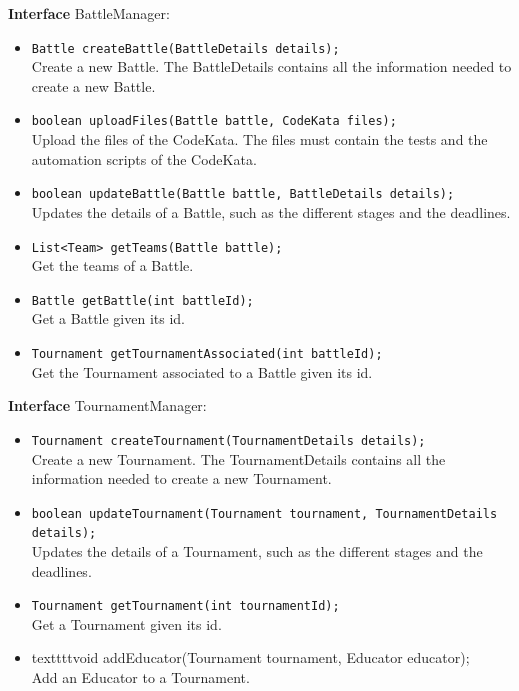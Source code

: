 \textbf{Interface} BattleManager:
\begin{itemize}
    \item \texttt{Battle createBattle(BattleDetails details);}
    \\ Create a new Battle. The BattleDetails contains all the information needed to create a new Battle.
    \item \texttt{boolean uploadFiles(Battle battle, CodeKata files);}
    \\ Upload the files of the CodeKata. The files must contain the tests and the automation scripts of the CodeKata.
    \item \texttt{boolean updateBattle(Battle battle, BattleDetails details);}
    \\ Updates the details of a Battle, such as the different stages and the deadlines.
    \item \texttt{List<Team> getTeams(Battle battle);}
    \\ Get the teams of a Battle.
    \item \texttt{Battle getBattle(int battleId);}
    \\ Get a Battle given its id.
    \item \texttt{Tournament getTournamentAssociated(int battleId);}
    \\ Get the Tournament associated to a Battle given its id.
\end{itemize}

\textbf{Interface} TournamentManager:
\begin{itemize}
    \item \texttt{Tournament createTournament(TournamentDetails details);}
    \\ Create a new Tournament. The TournamentDetails contains all the information needed to create a new Tournament.
    \item \texttt{boolean updateTournament(Tournament tournament, TournamentDetails details);}
    \\ Updates the details of a Tournament, such as the different stages and the deadlines.
    \item \texttt{Tournament getTournament(int tournamentId);}
    \\ Get a Tournament given its id.
    \item textttt{void addEducator(Tournament tournament, Educator educator);}
    \\ Add an Educator to a Tournament.
\end{itemize}

